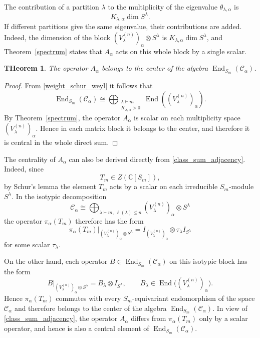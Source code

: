 \documentclass[12pt,reqno]{amsart}
\newtheorem{theorem}{THeorem}[section]
\newcommand{\End}{\operatorname{End}}
\begin{document}
The contribution of a partition $\lambda$ to the multiplicity of the
eigenvalue $\theta_{\lambda,\alpha}$ is
$$
K_{\lambda,\alpha}\dim S^\lambda.
$$
If different partitions give the same eigenvalue, their contributions are
added. Indeed, the dimension of the block
$(V_\lambda^{(n)})_\alpha\otimes S^\lambda$ is
$K_{\lambda,\alpha}\dim S^\lambda$, and Theorem~\ref{spectrum} states that
$A_\alpha$ acts on this whole block by a single scalar.


\begin{theorem}
The operator $A_\alpha$ belongs to the center of the algebra
$\End_{S_m}(\mathcal C_\alpha)$.
\end{theorem}

\begin{proof}
From \eqref{weight_schur_weyl} it follows that
$$
\End_{S_m}(\mathcal C_\alpha)
\cong
\bigoplus_{\substack{\lambda\vdash m\\K_{\lambda,\alpha}>0}}
\End((V_\lambda^{(n)})_\alpha).
$$
By Theorem~\ref{spectrum}, the operator $A_\alpha$ is scalar on each
multiplicity space $(V_\lambda^{(n)})_\alpha$. Hence in each matrix block
it belongs to the center, and therefore it is central in the whole direct
sum.
\end{proof}


The centrality of $A_\alpha$ can also be derived directly from
\eqref{class_sum_adjacency}. Indeed, since
$$
T_m\in Z(\mathbb C[S_m]),
$$
by Schur's lemma the element $T_m$ acts by a scalar on each irreducible
$S_m$-module $S^\lambda$. In the isotypic decomposition
$$
\mathcal C_\alpha
\cong
\bigoplus_{\lambda\vdash m,\ \ell(\lambda)\le n}
(V_\lambda^{(n)})_\alpha\otimes S^\lambda
$$
the operator $\pi_\alpha(T_m)$ therefore has the form
$$
\pi_\alpha(T_m)\big|_{(V_\lambda^{(n)})_\alpha\otimes S^\lambda}
=
I_{(V_\lambda^{(n)})_\alpha}
\otimes
\tau_\lambda I_{S^\lambda}
$$
for some scalar $\tau_\lambda$.

On the other hand, each operator
$B\in\End_{S_m}(\mathcal C_\alpha)$ on this isotypic block has the form
$$
B\big|_{(V_\lambda^{(n)})_\alpha\otimes S^\lambda}
=
B_\lambda\otimes I_{S^\lambda},
\qquad
B_\lambda\in
\End\bigl((V_\lambda^{(n)})_\alpha\bigr).
$$
Hence $\pi_\alpha(T_m)$ commutes with every $S_m$-equivariant
endomorphism of the space $\mathcal C_\alpha$ and therefore belongs to the
center of the algebra $\End_{S_m}(\mathcal C_\alpha)$. In view of
\eqref{class_sum_adjacency}, the operator $A_\alpha$ differs from
$\pi_\alpha(T_m)$ only by a scalar operator, and hence is also a central
element of $\End_{S_m}(\mathcal C_\alpha)$.
\end{document}
